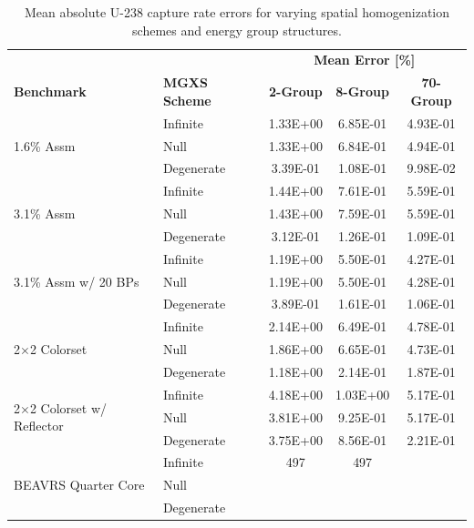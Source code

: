 \begin{table}[h!]
  \centering
  \caption[Mean OpenMOC U-238 capture rate errors]{Mean absolute U-238 capture rate errors for varying spatial homogenization schemes and energy group structures.}
  \small
  \label{table:chap8-openmoc-mean-capt-rates}
  \vspace{6pt}
  \begin{tabular}{l l c c c}
  \toprule
  \rowcolor{lightgray}
  & & \multicolumn{3}{c}{\cellcolor{lightgray} \textbf{Mean Error [\%]}} \\
  \multirow{-2}{*}{\cellcolor{lightgray} \bf Benchmark} &
  \multirow{-2}{*}{\cellcolor{lightgray} \bf \ac{MGXS} Scheme} &
  \multicolumn{1}{c}{{\cellcolor{lightgray} \bf 2-Group}} &
  \multicolumn{1}{c}{{\cellcolor{lightgray} \bf 8-Group}} &
  \multicolumn{1}{c}{{\cellcolor{lightgray} \bf 70-Group}} \\
  \midrule
\multirow{3}{*}{\parbox{2.5cm}{1.6\% Assm}} & Infinite & 1.33E+00 & 6.85E-01 & 4.93E-01 \\
& Null & 1.33E+00 & 6.84E-01 & 4.94E-01 \\
& Degenerate & 3.39E-01 & 1.08E-01 & 9.98E-02 \\
  \midrule
\multirow{3}{*}{\parbox{2.5cm}{3.1\% Assm}} & Infinite & 1.44E+00 & 7.61E-01 & 5.59E-01 \\
& Null & 1.43E+00 & 7.59E-01 & 5.59E-01 \\
& Degenerate & 3.12E-01 & 1.26E-01 & 1.09E-01 \\
  \midrule
\multirow{3}{*}{\parbox{2.5cm}{3.1\% Assm w/ 20 BPs}} & Infinite & 1.19E+00 & 5.50E-01 & 4.27E-01 \\
& Null & 1.19E+00 & 5.50E-01 & 4.28E-01 \\
& Degenerate & 3.89E-01 & 1.61E-01 & 1.06E-01 \\
  \midrule
\multirow{3}{*}{\parbox{2.5cm}{2$\times$2 Colorset}} & Infinite & 2.14E+00 & 6.49E-01 & 4.78E-01 \\
& Null & 1.86E+00 & 6.65E-01 & 4.73E-01 \\
& Degenerate & 1.18E+00 & 2.14E-01 & 1.87E-01 \\
  \midrule
\multirow{3}{*}{\parbox{2.5cm}{2$\times$2 Colorset w/ Reflector}} & Infinite & 4.18E+00 & 1.03E+00 & 5.17E-01 \\
& Null & 3.81E+00 & 9.25E-01 & 5.17E-01 \\
& Degenerate & 3.75E+00 & 8.56E-01 & 2.21E-01 \\
  \midrule
  \multirow{3}{*}{\parbox{2cm}{\ac{BEAVRS} Quarter Core}} & Infinite & 497 & 497 & \\
  & Null & & & \\
  & Degenerate & & & \\
  \bottomrule
\end{tabular}
\end{table}


